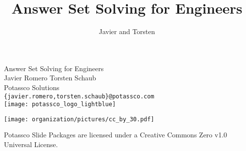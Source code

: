 \title{Answer Set Solving for Engineers}
\author{Javier and Torsten}
\begin{frame}[c]
  \bigskip
  \vfill
  \begin{center}%
    \alert{\huge Answer Set Solving for Engineers}
    \bigskip
    \bigskip
    \\
    Javier Romero \quad
    Torsten Schaub\\
    Potassco Solutions\\
    \texttt{\{javier.romero,torsten.schaub\}@potassco.com}\\
    \bigskip
    \texttt{[image: potassco\_logo\_lightblue]}
  \end{center}
  \bigskip
  \begin{center}
    \texttt{[image: organization/pictures/cc\_by\_30.pdf]} %
    \par
    {\tiny Potassco Slide Packages are licensed under a Creative Commons Zero v1.0 Universal License.}
  \end{center}
\end{frame}
%
